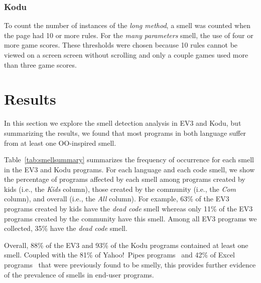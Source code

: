 \documentclass[conference]{IEEEtran}
\begin{document}
\subsubsection{Kodu}
To count the number of instances of the \emph{long method}, a smell was counted when the page had 10 or more rules. For the  \emph{many parameters} smell, the use of four or more game scores. These thresholds were chosen because 10 rules cannot be viewed on a screen screen without scrolling and only a couple games used more than three game scores. 


\section{Results}
\label{sec:results}
In this section we explore the smell detection analysis in EV3 and Kodu, but summarizing the results, we found that most programs in both language suffer from at least one OO-inspired smell. 

Table~\ref{tab:smellsummary} summarizes the frequency of occurrence for each smell in the EV3 and Kodu programs. 
For each language and each code smell, we show the percentage of programs affected by each smell among programs created by kids (i.e., the \emph{Kids} column), those created by the community (i.e., the \emph{Com} column), and overall (i.e., the \emph{All} column). For example, 63\% of the EV3 programs created by kids have the \emph{dead code} smell whereas only 11\% of the EV3 programs created by the community have this smell. Among all EV3 programs we collected, 35\% have the \emph{dead code} smell. 
 
Overall, 88\% of the EV3 and 93\% of the Kodu programs contained at least one smell. Coupled with the 81\% of Yahoo!\ Pipes programs~\cite{StoleeTSE2013} and 42\% of Excel programs~\cite{Hermans2012intra} that were previously found to be smelly, this provides further evidence of the prevalence of smells in end-user programs. 
\end{document}
